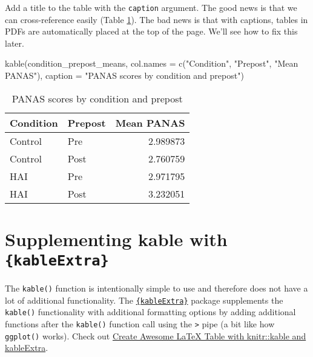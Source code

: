 \documentclass[
  doc]{apa6}
\newenvironment{Shaded}{\begin{snugshade}}{\end{snugshade}}
\newcommand{\AttributeTok}[1]{\textcolor[rgb]{0.77,0.63,0.00}{#1}}
\newcommand{\FunctionTok}[1]{\textcolor[rgb]{0.00,0.00,0.00}{#1}}
\newcommand{\NormalTok}[1]{#1}
\newcommand{\StringTok}[1]{\textcolor[rgb]{0.31,0.60,0.02}{#1}}
\begin{document}
Add a title to the table with the \texttt{caption} argument. The good news is that we can cross-reference easily (Table \ref{tab:title-table}). The bad news is that with captions, tables in PDFs are automatically placed at the top of the page. We'll see how to fix this later.

\begin{Shaded}
\begin{Highlighting}[]
\FunctionTok{kable}\NormalTok{(condition\_prepost\_means,}
      \AttributeTok{col.names =} \FunctionTok{c}\NormalTok{(}\StringTok{"Condition"}\NormalTok{, }\StringTok{"Prepost"}\NormalTok{, }\StringTok{"Mean PANAS"}\NormalTok{), }
      \AttributeTok{caption =} \StringTok{"PANAS scores by condition and prepost"}\NormalTok{)}
\end{Highlighting}
\end{Shaded}

\begin{table}

\caption{\label{tab:title-table}PANAS scores by condition and prepost}
\centering
\begin{tabular}[t]{l|l|r}
\hline
Condition & Prepost & Mean PANAS\\
\hline
Control & Pre & 2.989873\\
\hline
Control & Post & 2.760759\\
\hline
HAI & Pre & 2.971795\\
\hline
HAI & Post & 3.232051\\
\hline
\end{tabular}
\end{table}

\newpage

\hypertarget{supplementing-kable-with-kableextra}{%
\section{\texorpdfstring{Supplementing kable with \texttt{\{kableExtra\}}}{Supplementing kable with \{kableExtra\}}}\label{supplementing-kable-with-kableextra}}

The \texttt{kable()} function is intentionally simple to use and therefore does not have a lot of additional functionality. The \href{https://haozhu233.github.io/kableExtra/}{\texttt{\{kableExtra\}}} package supplements the \texttt{kable()} functionality with additional formatting options by adding additional functions after the \texttt{kable()} function call using the \texttt{\textbar{}\textgreater{}} pipe (a bit like how \texttt{ggplot()} works). Check out \href{https://haozhu233.github.io/kableExtra/awesome_table_in_pdf.pdf}{Create Awesome LaTeX Table with knitr::kable and kableExtra}.
\end{document}
